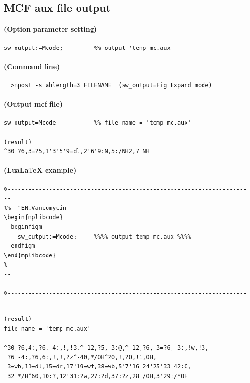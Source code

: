 \documentclass[a4paper]{article}
\begin{document}
\subsection{MCF aux file output}
\paragraph{(Option parameter setting)}
%
\begin{verbatim}
sw_output:=Mcode;         %% output 'temp-mc.aux'
\end{verbatim}
\paragraph{(Command line)}
\begin{verbatim}
  >mpost -s ahlength=3 FILENAME  (sw_output=Fig Expand mode)
\end{verbatim}
\paragraph{(Output mcf file)}
\begin{verbatim}
sw_output=Mcode           %% file name = 'temp-mc.aux'

(result)
^30,?6,3=?5,1'3'5'9=dl,2'6'9:N,5:/NH2,7:NH

\end{verbatim}
\paragraph{(LuaLaTeX example)}
\begin{verbatim}
%-----------------------------------------------------------------------
%%  "EN:Vancomycin
\begin{mplibcode}
  beginfigm
    sw_output:=Mcode;     %%%% output temp-mc.aux %%%%
  endfigm
\end{mplibcode}
%-----------------------------------------------------------------------

%-----------------------------------------------------------------------
\end{verbatim}
\begin{verbatim}
(result)
file name = 'temp-mc.aux'

^30,?6,4:,?6,-4:,!,!3,^-12,?5,-3:@,^-12,?6,-3=?6,-3:,!w,!3,
 ?6,-4:,?6,6:,!,!,?z^-40,*/OH^20,!,?O,!1,OH,
 3=wb,11=dl,15=dr,17'19=wf,38=wb,5'7'16'24'25'33'42:O,
 32:*/H^60,10:?,12'31:?w,27:?d,37:?z,28:/OH,3'29:/*OH
\end{verbatim}
\newpage
\noindent%
\end{document}
